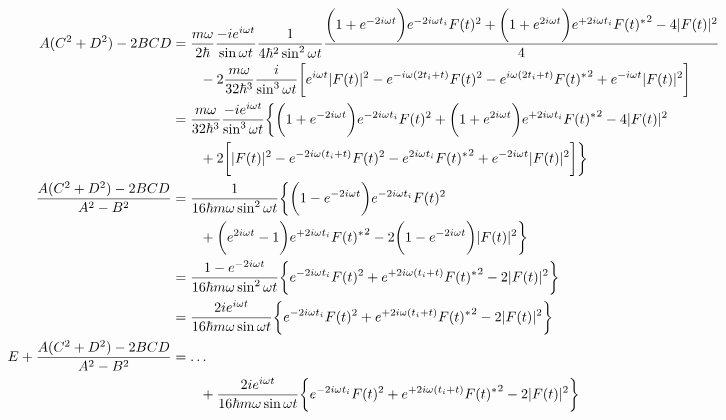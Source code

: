 \begin{align}
    A (C^2 + D^2) - 2 BCD
    &=
    \dfrac{m \omega}{2 \hbar}
    \dfrac{- i e^{i \omega t} }{\sin \omega t}
    \dfrac{1}{4 \hbar^2 \sin^2 \omega t}
    \dfrac{
        \bigg(
            1
        +
            e^{- 2 i \omega t}
        \bigg) 
        e^{- 2 i \omega t_i}
        F(t)^2
    +
        \bigg(
            1
        +
            e^{2 i \omega t}
        \bigg) 
        e^{+ 2 i \omega t_i} {F(t)^*}^2
    -
        4 | F(t) |^2
    }{4}
\notag\\&\qquad
    - 2
    \dfrac{m \omega}{32 \hbar^3}
    \dfrac{ i }{\sin^3 \omega t}
    \bigg[
        e^{i \omega t}
        | F(t) |^2
    -
        e^{- i \omega (2 t_i + t)} F(t)^2
    -
        e^{i \omega (2 t_i + t)} {F(t)^*}^2
    +
        e^{- i \omega t}
        | F(t) |^2
    \bigg]
\notag\\&
    =
    \dfrac{m \omega}{32 \hbar^3}
    \dfrac{ - i e^{i \omega t} }{\sin^3 \omega t}
    \bigg\{
        \bigg(
            1
        +
            e^{- 2 i \omega t}
        \bigg)
        e^{- 2 i \omega t_i}
        F(t)^2
    +
        \bigg(
            1
        +
            e^{2 i \omega t}
        \bigg) 
        e^{+ 2 i \omega t_i} {F(t)^*}^2
    -
        4 | F(t) |^2
    \notag\\&\qquad
    + 2
        \bigg[
            | F(t) |^2
        -
            e^{- 2 i \omega (t_i + t)} F(t)^2
        -
            e^{2 i \omega t_i} {F(t)^*}^2
        +
            e^{- 2 i \omega t}
            | F(t) |^2
        \bigg]
    \bigg\}
\notag\\
    \dfrac{
        A ( C^2 + D^2 )
    -
        2 BCD
    }{
        A^2 - B^2
    }
    &=
    \dfrac{1}{16 \hbar m \omega \sin^2 \omega t}
    \bigg\{
        \bigg(
            1
    -
            e^{- 2 i \omega t}
        \bigg)
        e^{- 2 i \omega t_i}
        F(t)^2
\notag\\&\qquad
    +
        \bigg(
            e^{2 i \omega t}
        -
            1
        \bigg) 
        e^{+ 2 i \omega t_i} {F(t)^*}^2
    - 2
        \bigg(
            1
        -
            e^{- 2 i \omega t}
        \bigg)
        | F(t) |^2
    \bigg\}
\notag\\&
    =
    \dfrac{
            1
        -
            e^{- 2 i \omega t}
    }{16 \hbar m \omega \sin^2 \omega t}
    \bigg\{
        e^{- 2 i \omega t_i}
        F(t)^2
    +
        e^{+ 2 i \omega (t_i + t)} {F(t)^*}^2
    - 2
        | F(t) |^2
    \bigg\}
\notag\\&
    =
    \dfrac{
        2 i
        e^{i \omega t}
    }{16 \hbar m \omega \sin \omega t}
    \bigg\{
        e^{- 2 i \omega t_i}
        F(t)^2
    +
        e^{+ 2 i \omega (t_i + t)} {F(t)^*}^2
    - 2
        | F(t) |^2
    \bigg\}
\notag\\
    E
    +
    \dfrac{
        A ( C^2 + D^2 )
    -
        2 BCD
    }{
        A^2 - B^2
    }
    &=
    \dots
\notag\\&\qquad
        +
        \dfrac{
            2 i
            e^{i \omega t}
        }{16 \hbar m \omega \sin \omega t}
        \bigg\{
            e^{- 2 i \omega t_i}
            F(t)^2
        +
            e^{+ 2 i \omega (t_i + t)} {F(t)^*}^2
        - 2
        | F(t) |^2
    \bigg\}
\end{align}
